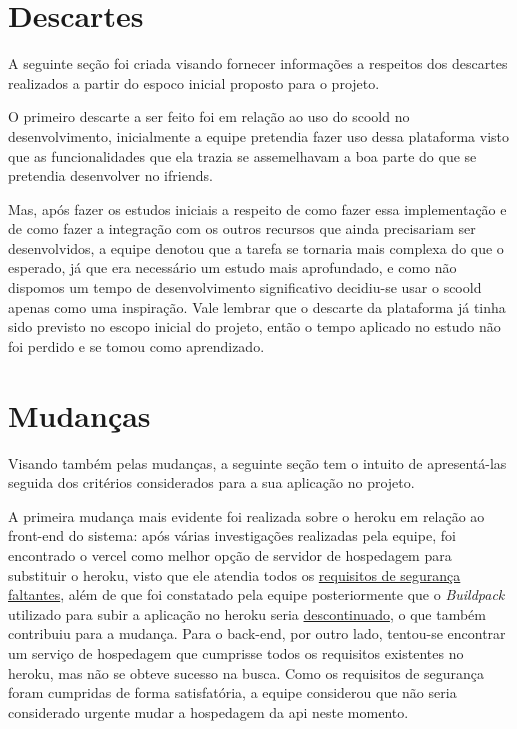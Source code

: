 \section{Descartes}
A seguinte seção foi criada visando fornecer informações a respeitos dos descartes realizados a partir do espoco inicial proposto para o projeto. 

O primeiro descarte a ser feito foi em relação ao uso do \gls{scoold} no desenvolvimento, inicialmente a equipe pretendia fazer uso dessa plataforma visto que as funcionalidades que ela trazia se assemelhavam a boa parte do que se pretendia desenvolver no \gls{ifriends}. 

Mas, após fazer os estudos iniciais a respeito de como fazer essa implementação e de como fazer a integração com os outros recursos que ainda precisariam ser desenvolvidos, a equipe denotou que a tarefa se tornaria mais complexa do que o esperado, já que era necessário um estudo mais aprofundado, e como não dispomos um tempo de desenvolvimento significativo decidiu-se usar o \gls{scoold} apenas como uma inspiração. Vale lembrar que o descarte da plataforma já tinha sido previsto no escopo inicial do projeto, então o tempo aplicado no estudo não foi perdido e se tomou como aprendizado.

 
 \section{Mudanças}
Visando também pelas mudanças, a seguinte seção tem o intuito de apresentá-las seguida dos critérios considerados para a sua aplicação no projeto. 
 
A primeira mudança mais evidente foi realizada sobre o \gls{heroku} em relação ao \gls{front-end} do sistema: após várias investigações realizadas pela equipe, foi encontrado o \gls{vercel} como melhor opção de servidor de hospedagem para substituir o \gls{heroku}, visto que ele atendia todos os \href{https://vercel.com/blog/automatic-ssl-with-vercel-lets-encrypt}{requisitos de segurança faltantes}, além de que foi constatado pela equipe posteriormente que o \textsl{Buildpack} utilizado para subir a aplicação no \gls{heroku} seria \href{https://github.com/mars/create-react-app-buildpack}{descontinuado}, o que também contribuiu para a mudança. Para o \gls{back-end}, por outro lado, tentou-se encontrar um serviço de hospedagem que cumprisse todos os requisitos existentes no \gls{heroku}, mas não se obteve sucesso na busca. Como os requisitos de segurança foram cumpridas de forma satisfatória, a equipe considerou que não seria considerado urgente mudar a hospedagem da \gls{api} neste momento.